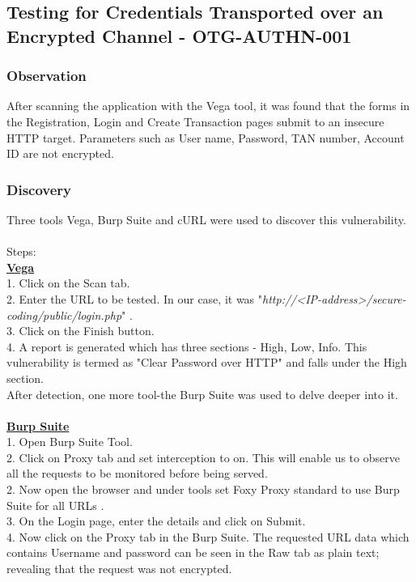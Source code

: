 \subsection{Testing for Credentials Transported over an Encrypted Channel - OTG-AUTHN-001}


\subsubsection{Observation}
After scanning the application with the Vega tool, it was found that the forms in the Registration, Login and Create Transaction pages submit to an insecure HTTP target. Parameters such as User name, Password, TAN number, Account ID are not encrypted. 

\subsubsection{Discovery}
Three tools Vega, Burp Suite and cURL were used to discover this vulnerability.\\\\
Steps: \\
\underline{\textbf{Vega}}\\
1. Click on the Scan tab. \\
2. Enter the URL to be tested. In our case, it was "\textit{http://<IP-address>/secure-coding/public/login.php}" .\\
3. Click on the Finish button. \\
4. A report is generated which has three sections - High, Low, Info. This vulnerability is termed as "Clear Password over HTTP" and falls under the High section.\\
After detection, one more tool-the Burp Suite was used to delve deeper into it.\\ \\
\underline{\textbf{Burp Suite}}\\
1. Open Burp Suite Tool.\\
2. Click on Proxy tab and set  interception to on. This will enable us to observe all the requests to be monitored before being served. \\
2. Now open the browser and under tools set Foxy Proxy standard to use Burp Suite for all URLs .\\
3. On the Login page, enter the details and click on Submit.\\
4. Now click  on the Proxy tab in the Burp Suite. The requested URL data which contains Username and password can be seen in the Raw tab as plain text; revealing that the request was not encrypted. \\
